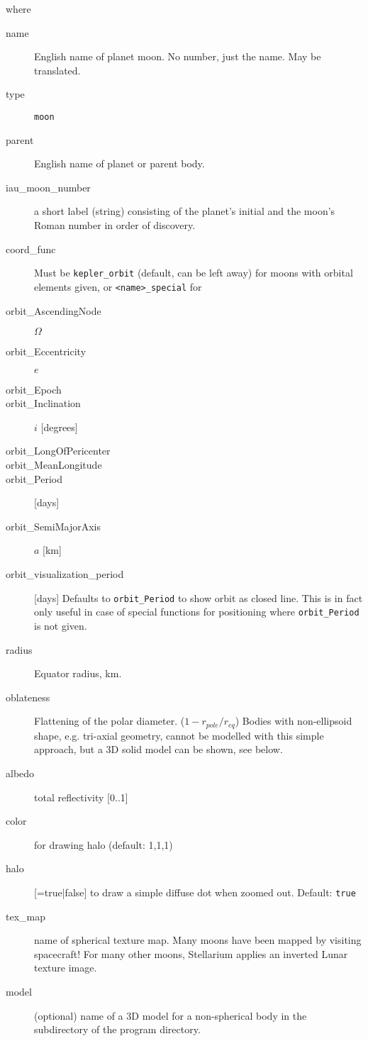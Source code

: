 where
\begin{description}
  \item[name] English name of planet moon. No number, just the name. May be translated.
  \item[type] \texttt{moon}

  \item[parent] English name of planet or parent body.
  \item[iau\_moon\_number] a short label (string) consisting of the planet's initial and the moon's Roman number in order of discovery.

  \item[coord\_func] Must be \texttt{kepler\_orbit} (default, can be left away) for moons with orbital elements given, or \texttt{<name>\_special} for 
  \item[orbit\_AscendingNode] $\Omega$
  \item[orbit\_Eccentricity] $e$
  \item[orbit\_Epoch] 
  \item[orbit\_Inclination] $i$ [degrees]
  \item[orbit\_LongOfPericenter] 
  \item[orbit\_MeanLongitude]
  \item[orbit\_Period] [days]
  \item[orbit\_SemiMajorAxis] $a$ [km]
  \item[orbit\_visualization\_period] [days] Defaults to \texttt{orbit\_Period} to show orbit as closed line. 
       This is in fact only useful in case of special functions for positioning where \texttt{orbit\_Period} is not given.

  \item[radius] Equator radius, km.
  \item[oblateness] Flattening of the polar
    diameter. ($1-r_{pole}/r_{eq}$) Bodies with non-ellipsoid shape,
    e.g. tri-axial geometry, cannot be modelled with this simple
    approach, but a 3D solid model can be shown, see below.
    
  \item[albedo] total reflectivity [0..1]
  \item[color] for drawing halo (default: 1,1,1)
  \item[halo] [=true|false] to draw a simple diffuse dot when zoomed out. Default: \texttt{true}
  \item[tex\_map] name of spherical texture map. Many moons have been mapped by visiting spacecraft! For many other moons, Stellarium applies an inverted Lunar texture image.
  \item[model] (optional) name of a 3D model for a non-spherical body in the  subdirectory of the program directory. 


\end{description}

